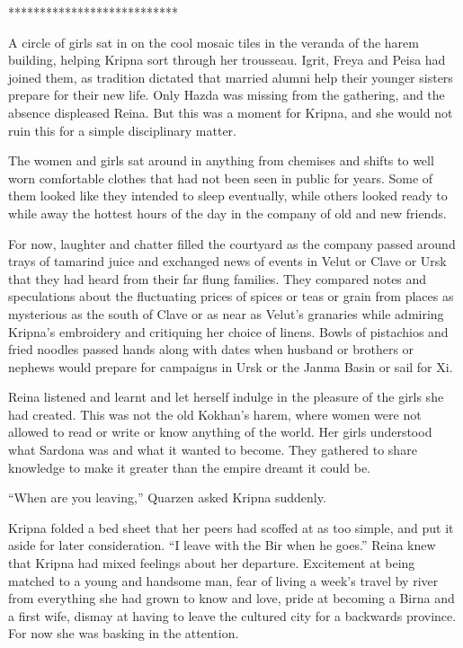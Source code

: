 \documentclass{article}
\begin{document}
	***************************
	
	A circle of girls sat in on the cool mosaic tiles in the veranda of the harem building, helping Kripna sort through her trousseau. Igrit, Freya and Peisa had joined them, as tradition dictated that married alumni help their younger sisters prepare for their new life. Only Hazda was missing from the gathering, and the absence displeased Reina. But this was a moment for Kripna, and she would not ruin this for a simple disciplinary matter.
	
	The women and girls sat around in anything from chemises and shifts to well worn comfortable clothes that had not been seen in public for years. Some of them looked like they intended to sleep eventually, while others looked ready to while away the hottest hours of the day in the company of old and new friends. 
	
	For now, laughter and chatter filled the courtyard as the company passed around trays of tamarind juice and exchanged news of events in Velut or Clave or Ursk that they had heard from their far flung families. They compared notes and speculations about the fluctuating prices of spices or teas or grain from places as mysterious as the south of Clave or as near as Velut’s granaries while admiring Kripna’s embroidery and critiquing her choice of linens. Bowls of pistachios and fried noodles passed hands along with dates when husband or brothers or nephews would prepare for campaigns in Ursk or the Janma Basin or sail for Xi.
	
	Reina listened and learnt and let herself indulge in the pleasure of the girls she had created. This was not the old Kokhan’s harem, where women were not allowed to read or write or know anything of the world. Her girls understood what Sardona was and what it wanted to become. They gathered to share knowledge to make it greater than the empire dreamt it could be. 
	
	“When are you leaving,” Quarzen asked Kripna suddenly. 
	
	Kripna folded a bed sheet that her peers had scoffed at as too simple, and put it aside for later consideration. “I leave with the Bir when he goes.” Reina knew that Kripna had mixed feelings about her departure. Excitement at being matched to a young and handsome man, fear of living a week’s travel by river from everything she had grown to know and love, pride at becoming a Birna and a first wife, dismay at having to leave the cultured city for a backwards province. For now she was basking in the attention. 
	
\end{document}
